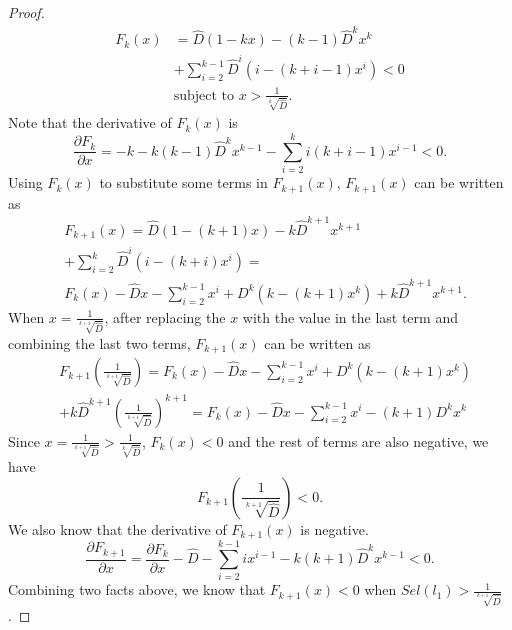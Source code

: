 \documentclass{sigmod}
\newcommand{\is}{\newline \noindent {\bf Induction:} }
\begin{document}
\begin{proof}
\begin{align*}
F_k(x) &= \hat{D}(1 - kx) - (k - 1)\hat{D}^kx^k\\
&+ \sum_{i=2}^{k - 1}\hat{D}^i(i -(k + i - 1) x^i) < 0\\
& \text{subject to }  x > \frac{1}{\sqrt[k]{\hat{D}}}.
\end{align*}
Note that the derivative of  $F_k(x)$ is
\[
\frac{\partial F_{k}}{\partial x}= -k - k(k-1)\hat{D}^kx^{k-1}-\sum_{i=2}^ki(k+i-1)x^{i-1} < 0.
\]
\is Using $F_k(x)$ to substitute some terms in $F_{k+1}(x)$,  $F_{k+1}(x)$ can be written as
\begin{align*}
&F_{k+1}(x) = \hat{D}(1 - (k+1)x) - k\hat{D}^{k+1}x^{k+1}\\
&+ \sum_{i=2}^{k}\hat{D}^i(i -(k + i ) x^i) =\\
 &F_k(x) - \hat{D}x -  \sum_{i=2}^{k-1}x^i + D^k(k - (k+1)x^k) + k\hat{D}^{k+1}x^{k+1}.
\end{align*}
When  $x = \frac{1}{\sqrt[k+1]{\hat{D}}}$, after replacing the $x$ with the value in the last term and combining the last two terms, $F_{k+1}(x)$ can be written as
\begin{align*}
&F_{k+1}(\frac{1}{\sqrt[k+1]{\hat{D}}}) = F_k(x) - \hat{D}x -  \sum_{i=2}^{k-1}x^i + D^k(k - (k+1)x^k) \\
&+ k\hat{D}^{k+1}(\frac{1}{\sqrt[k+1]{\hat{D}}})^{k+1} = F_k(x) - \hat{D}x -  \sum_{i=2}^{k-1}x^i -(k+1)D^kx^k
\end{align*}
Since $x = \frac{1}{\sqrt[k+1]{\hat{D}}} > \frac{1}{\sqrt[k]{\hat{D}}}$, $F_k(x) < 0$ and the rest of terms are also negative, we have
\[
F_{k+1}(\frac{1}{\sqrt[k+1]{\hat{D}}}) < 0.
\]
We also know that the derivative of $F_{k+1}(x)$ is negative. 
\[
\frac{\partial F_{k+1}}{\partial x} = \frac{\partial F_{k}}{\partial x} - \hat{D} - \sum_{i=2}^{k-1}ix^{i-1} - k(k+1)\hat{D}^kx^{k-1} < 0.
\]
Combining two facts above, we know that $F_{k+1}(x) < 0$ when $Sel(l_1) > \frac{1}{\sqrt[k+1]{\hat{D}}}$.
\end{proof}
\end{document}
